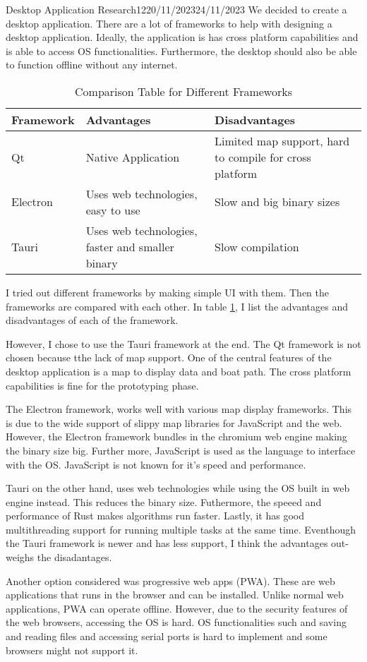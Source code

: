 \documentclass[12pt]{article}
\begin{document}
\begin{logbook-entry}{Desktop Application Research}{12}{20/11/2023}{24/11/2023}
We decided to create a desktop application.
There are a lot of frameworks to help with designing a desktop application.
Ideally, the application is has cross platform capabilities and is able to access OS functionalities.
Furthermore, the desktop should also be able to function offline without any internet.

\begin{table}[H]
    \centering{}
    \caption{Comparison Table for Different Frameworks}
    \label{tab:desktop-framework-table}
    \begin{tabularx}{\textwidth}{l X X}
        \hline
        Framework & Advantages & Disadvantages\\
        \hline
        Qt & Native Application & Limited map support, hard to compile for cross platform\\
        Electron & Uses web technologies, easy to use & Slow and big binary sizes\\
        Tauri & Uses web technologies, faster and smaller binary & Slow compilation\\
        \hline
    \end{tabularx}
\end{table}

I tried out different frameworks by making simple UI with them.
Then the frameworks are compared with each other.
In table \ref{tab:desktop-framework-table}, I list the advantages and disadvantages of each of the framework.

However, I chose to use the Tauri framework at the end.
The Qt framework is not chosen because tthe lack of map support.
One of the central features of the desktop application is a map to display data and boat path.
The cross platform capabilities is fine for the prototyping phase.

The Electron framework, works well with various map display frameworks.
This is due to the wide support of slippy map libraries for JavaScript and the web.
However, the Electron framework bundles in the chromium web engine making the binary size big.
Further more, JavaScript is used as the language to interface with the OS.
JavaScript is not known for it's speed and performance.

Tauri on the other hand, uses web technologies while using the OS built in web engine instead.
This reduces the binary size.
Futhermore, the speeed and performance of Rust makes algorithms run faster.
Lastly, it has good multithreading support for running multiple tasks at the same time.
Eventhough the Tauri framework is newer and has less support, I think the advantages out-weighs the disadantages.

Another option considered was progressive web apps (PWA).
These are web applications that runs in the browser and can be installed.
Unlike normal web applications, PWA can operate offline.
However, due to the security features of the web browsers, accessing the OS is hard.
OS functionalities such and saving and reading files and accessing serial ports is hard to implement and some browsers might not support it.
\end{logbook-entry}
\end{document}
